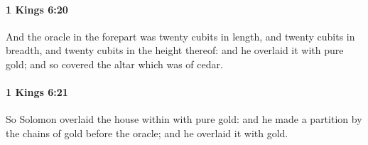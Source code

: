 		\paragraph{1 Kings 6:20} %
			\label{1KINGS-6-20}

			And the oracle in the forepart was twenty cubits in length, and twenty cubits in breadth, and twenty cubits in the height thereof: and he overlaid it with pure gold; and so covered the altar which was of cedar.


		\paragraph{1 Kings 6:21} %
			\label{1KINGS-6-21}

			So Solomon overlaid the house within with pure gold: and he made a partition by the chains of gold before the oracle; and he overlaid it with gold.


